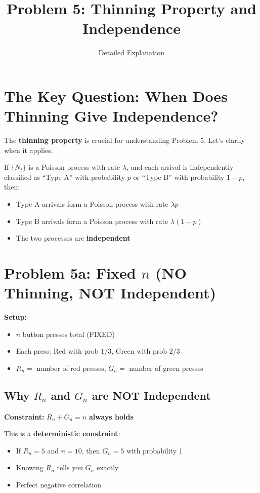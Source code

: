 \documentclass[12pt]{article}
\title{Problem 5: Thinning Property and Independence}
\author{Detailed Explanation}
\date{}
\begin{document}
\maketitle

\section*{The Key Question: When Does Thinning Give Independence?}

The \textbf{thinning property} is crucial for understanding Problem 5. Let's clarify when it applies.

\begin{tcolorbox}[colback=blue!5!white,colframe=blue!75!black,title=Thinning Property]
If $\{N_t\}$ is a Poisson process with rate $\lambda$, and each arrival is independently classified as ``Type A'' with probability $p$ or ``Type B'' with probability $1-p$, then:
\begin{itemize}
    \item Type A arrivals form a Poisson process with rate $\lambda p$
    \item Type B arrivals form a Poisson process with rate $\lambda(1-p)$
    \item The two processes are \textbf{independent}
\end{itemize}
\end{tcolorbox}

\section*{Problem 5a: Fixed $n$ (NO Thinning, NOT Independent)}

\textbf{Setup:}
\begin{itemize}
    \item $n$ button presses total (FIXED)
    \item Each press: Red with prob $1/3$, Green with prob $2/3$
    \item $R_n =$ number of red presses, $G_n =$ number of green presses
\end{itemize}

\subsection*{Why $R_n$ and $G_n$ are NOT Independent}

\textbf{Constraint:} $R_n + G_n = n$ \textbf{always holds}

This is a \textbf{deterministic constraint}:
\begin{itemize}
    \item If $R_n = 5$ and $n = 10$, then $G_n = 5$ with probability 1
    \item Knowing $R_n$ tells you $G_n$ exactly
    \item Perfect negative correlation
\end{itemize}
\end{document}
